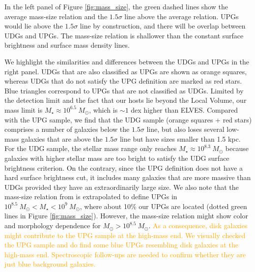 \documentclass[twocolumn,astrosymb,twocolappendix,linenumbers]{aastex631}
\newcommand{\emphasize}{\textcolor{orange}}
\begin{document}
\begin{CJK*}{UTF8}{gbsn}
In the left panel of Figure \ref{fig:mass_size}, the green dashed lines show the average mass-size relation and the $1.5\sigma$ line above the average relation. UPGs would lie above the $1.5\sigma$ line by construction, and there will be overlap between UDGs and UPGs. The mass-size relation is shallower than the constant surface brightness and surface mass density lines. 

We highlight the similarities and differences between the UDGs and UPGs in the right panel. UDGs that are also classified as UPGs are shown as orange squares, whereas UDGs that do not satisfy the UPG definition are marked as red stars. Blue triangles correspond to UPGs that are not classified as UDGs. Limited by the detection limit and the fact that our hosts lie beyond the Local Volume, our mass limit is $M_\star \approx 10^{6.5}\ M_\odot$, which is $\sim 1$ dex higher than ELVES. 
Compared with the UPG sample, we find that the UDG sample (orange squares + red stars) comprises a number of galaxies below the $1.5\sigma$ line, but also loses several low-mass galaxies that are above the $1.5\sigma$ line but have sizes smaller than 1.5 kpc. For the UDG sample, the stellar mass range only reaches $M_\star\approx 10^{8.3}\ M_\odot$ because galaxies with higher stellar mass are too bright to satisfy the UDG surface brightness criterion. On the contrary, since the UPG definition does not have a hard surface brightness cut, it includes many galaxies that are more massive than UDGs provided they have an extraordinarily large size. We also note that the mass-size relation from \citet{ELVES-I} is extrapolated to define UPGs in $10^{8.5}\ M_\odot < M_\star < 10^9\ M_\odot$, where about 10\% our UPGs are located (dotted green lines in Figure \ref{fig:mass_size}). However, the mass-size relation might show color and morphology dependence for $M_\odot > 10^{8.5}\ M_\odot$. \emphasize{As a consequence, disk galaxies might contribute to the UPG sample at the high-mass end. We visually checked the UPG sample and do find some blue UPGs resembling disk galaxies at the high-mass end. Spectroscopic follow-ups are needed to confirm whether they are just blue background galaxies.}



\end{CJK*}
\end{document}
